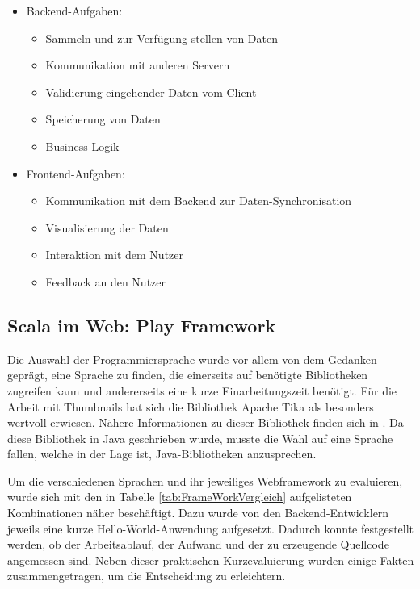 \begin{itemize}
  \item Backend-Aufgaben:
  \begin{itemize}
    \item Sammeln und zur Verfügung stellen von Daten
    \item Kommunikation mit anderen Servern
    \item Validierung eingehender Daten vom Client
    \item Speicherung von Daten
    \item Business-Logik
  \end{itemize}

\item Frontend-Aufgaben:
  \begin{itemize}
    \item Kommunikation mit dem Backend zur Daten-Synchronisation 
\item Visualisierung der Daten
    \item Interaktion mit dem Nutzer
    \item Feedback an den Nutzer
  \end{itemize}
\end{itemize}

\subsection{Scala im Web: Play Framework}
Die Auswahl der Programmiersprache wurde vor allem von dem Gedanken geprägt, eine Sprache zu finden, die einerseits auf benötigte Bibliotheken zugreifen kann und andererseits eine kurze Einarbeitungszeit benötigt. Für die Arbeit mit Thumbnails hat sich die Bibliothek Apache Tika als besonders wertvoll erwiesen. Nähere Informationen zu dieser Bibliothek finden sich in \cite{bp-dome}. Da diese Bibliothek in Java geschrieben wurde, musste die Wahl auf eine Sprache fallen, welche in der Lage ist, Java-Bibliotheken anzusprechen. 

Um die verschiedenen Sprachen und ihr jeweiliges Webframework zu evaluieren, wurde sich mit den in Tabelle \ref{tab:FrameWorkVergleich} aufgelisteten Kombinationen näher beschäftigt. Dazu wurde von den Backend-Entwicklern jeweils eine kurze Hello-World-Anwendung aufgesetzt. Dadurch konnte festgestellt werden, ob der Arbeitsablauf, der Aufwand und der zu erzeugende Quellcode angemessen sind. Neben dieser praktischen Kurzevaluierung wurden einige Fakten zusammengetragen, um die Entscheidung zu erleichtern.


